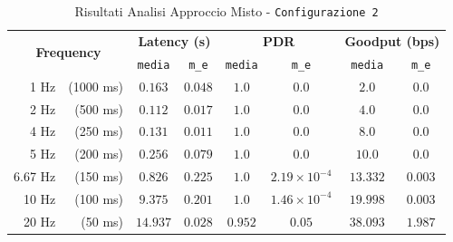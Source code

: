\begin{table}[hbt!]
    \centering
    \begin{tabular}{ |rr|| c|c|c|c|c|c| } 
        \hline
        \multicolumn{2}{|c||}{\multirow{2}{*}{\textbf{Frequency}}} & \multicolumn{2}{|c|}{\textbf{Latency \scriptsize (s)}} & \multicolumn{2}{|c|}{\textbf{PDR}} & \multicolumn{2}{|c|}{\textbf{Goodput \scriptsize (bps)}} \\
        && \texttt{media} & \texttt{m\_e} & \texttt{media} & \texttt{m\_e} & \texttt{media} & \texttt{m\_e} \\

		\hline
		1 Hz & \scriptsize (1000 ms) & $ 0.163 $ & $ 0.048 $ & $ 1.0 $ & $ 0.0 $ & $ 2.0 $ & $ 0.0 $ \\
		\hline
		2 Hz & \scriptsize (500 ms) & $ 0.112 $ & $ 0.017 $ & $ 1.0 $ & $ 0.0 $ & $ 4.0 $ & $ 0.0 $ \\
		\hline
		4 Hz & \scriptsize (250 ms) & $ 0.131 $ & $ 0.011 $ & $ 1.0 $ & $ 0.0 $ & $ 8.0 $ & $ 0.0 $ \\
		\hline
		5 Hz & \scriptsize (200 ms) & $ 0.256 $ & $ 0.079 $ & $ 1.0 $ & $ 0.0 $ & $ 10.0 $ & $ 0.0 $ \\
		\hline
		6.67 Hz & \scriptsize (150 ms) & $ 0.826 $ & $ 0.225 $ & $ 1.0 $ & $ 2.19 \times 10^{-4} $ & $ 13.332 $ & $ 0.003 $ \\
		\hline
		10 Hz & \scriptsize (100 ms) & $ 9.375 $ & $ 0.201 $ & $ 1.0 $ & $ 1.46 \times 10^{-4} $ & $ 19.998 $ & $ 0.003 $ \\
		\hline
		20 Hz & \scriptsize (50 ms) & $ 14.937 $ & $ 0.028 $ & $ 0.952 $ & $ 0.05 $ & $ 38.093 $ & $ 1.987 $ \\
		\hline
    \end{tabular}
    \caption{Risultati Analisi Approccio Misto - \texttt{Configurazione 2}}
    \label{tab:table_ble_wifi_conf_2}
\end{table}


